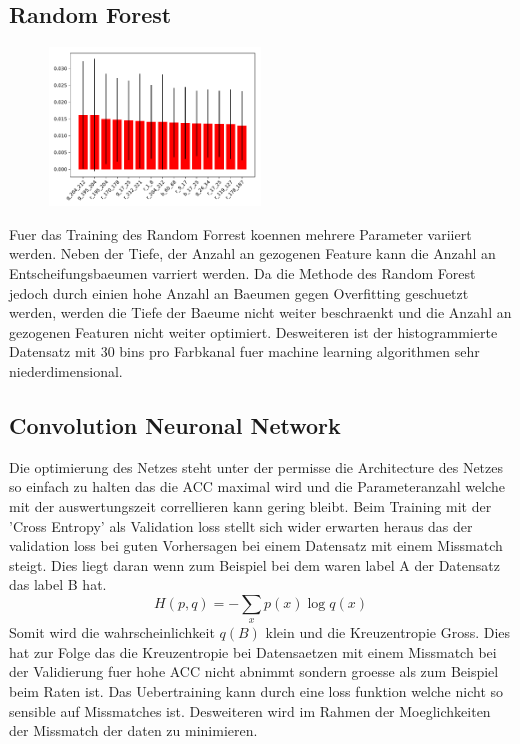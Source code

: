 \subsection{Random Forest}%
\label{sub:random_forest}
\begin{figure}
		\centering
		\includegraphics[width=0.5\textwidth]{./pictures/train_rf.pdf}
		\caption{}
		\label{fig:}
\end{figure}
Fuer das Training des Random Forrest koennen mehrere Parameter variiert werden.
Neben der Tiefe, der Anzahl an gezogenen Feature kann die Anzahl an
Entscheifungsbaeumen varriert werden.
Da die Methode des Random Forest jedoch durch einien hohe Anzahl an Baeumen
gegen Overfitting geschuetzt werden, werden die Tiefe der Baeume nicht weiter
beschraenkt und die Anzahl an gezogenen Featuren nicht weiter optimiert.
Desweiteren ist der histogrammierte Datensatz mit 30 bins pro Farbkanal fuer
machine learning algorithmen sehr niederdimensional.

\subsection{Convolution Neuronal Network}%
\label{sub:convolution_neuronal_network}

Die optimierung des Netzes steht unter der permisse die Architecture des Netzes
so einfach zu halten das die ACC maximal wird und die Parameteranzahl welche mit
der auswertungszeit correllieren kann gering bleibt. 
Beim Training mit der 'Cross Entropy' als Validation loss stellt sich wider
erwarten heraus das der validation loss bei guten Vorhersagen bei einem
Datensatz mit einem Missmatch steigt. 
Dies liegt daran wenn zum Beispiel bei dem waren label A der Datensatz das label
B hat. 
\begin{equation}
		H(p,q) = -\sum_x p(x) \log q(x)
\end{equation}
Somit wird die wahrscheinlichkeit $q(B)$ klein und die Kreuzentropie Gross.
Dies hat zur Folge das die Kreuzentropie bei Datensaetzen mit einem Missmatch
bei der Validierung fuer hohe ACC nicht abnimmt sondern groesse als zum Beispiel
beim Raten ist.
Das Uebertraining kann durch eine loss funktion welche nicht so sensible auf
Missmatches ist. 
Desweiteren wird im Rahmen der Moeglichkeiten der Missmatch der daten zu
minimieren.

